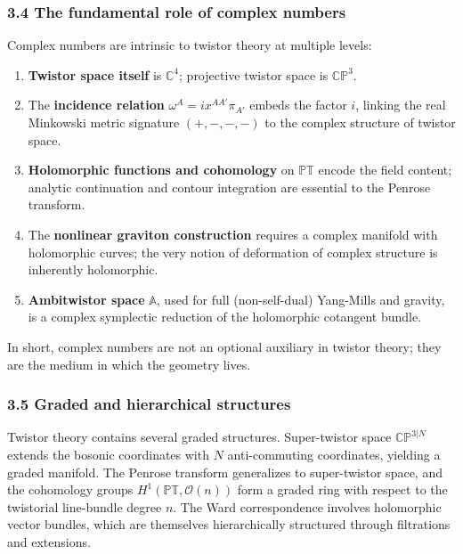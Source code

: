 \documentclass[
  11pt,
  letterpaper,
]{article}
\providecommand{\tightlist}{%
  \setlength{\itemsep}{0pt}\setlength{\parskip}{0pt}}
\begin{document}
\subsubsection{3.4 The fundamental role of complex
numbers}\label{the-fundamental-role-of-complex-numbers}

Complex numbers are intrinsic to twistor theory at multiple levels:

\begin{enumerate}
\def\labelenumi{\arabic{enumi}.}
\tightlist
\item
  \textbf{Twistor space itself} is \(\mathbb{C}^4\); projective twistor
  space is \(\mathbb{CP}^3\).
\item
  The \textbf{incidence relation} \(\omega^A = i x^{AA'} \pi_{A'}\)
  embeds the factor \(i\), linking the real Minkowski metric signature
  \((+,-,-,-)\) to the complex structure of twistor space.
\item
  \textbf{Holomorphic functions and cohomology} on \(\mathbb{PT}\)
  encode the field content; analytic continuation and contour
  integration are essential to the Penrose transform.
\item
  The \textbf{nonlinear graviton construction} requires a complex
  manifold with holomorphic curves; the very notion of deformation of
  complex structure is inherently holomorphic.
\item
  \textbf{Ambitwistor space} \(\mathbb{A}\), used for full
  (non-self-dual) Yang-Mills and gravity, is a complex symplectic
  reduction of the holomorphic cotangent bundle.
\end{enumerate}

In short, complex numbers are not an optional auxiliary in twistor
theory; they are the medium in which the geometry lives.

\subsubsection{3.5 Graded and hierarchical
structures}\label{graded-and-hierarchical-structures}

Twistor theory contains several graded structures. Super-twistor space
\(\mathbb{CP}^{3|N}\) extends the bosonic coordinates with \(N\)
anti-commuting coordinates, yielding a graded manifold. The Penrose
transform generalizes to super-twistor space, and the cohomology groups
\(H^1(\mathbb{PT}, \mathcal{O}(n))\) form a graded ring with respect to
the twistorial line-bundle degree \(n\). The Ward correspondence
involves holomorphic vector bundles, which are themselves hierarchically
structured through filtrations and extensions.
\end{document}
